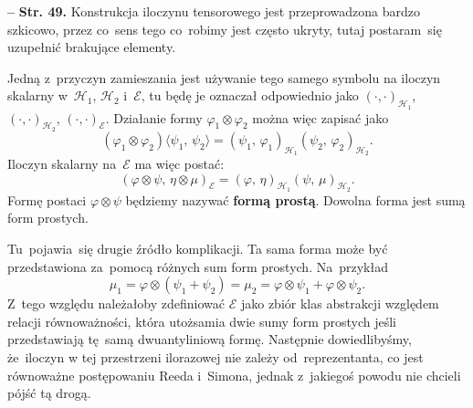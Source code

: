 \documentclass[a4paper,11pt]{article}
\newcommand{\spaceFour}{0.5em}
\newcommand{\tb}{\textbf}
\newcommand{\noi}{\noindent}
\newcommand{\tb}{\textbf}
\newcommand{\noi}{\noindent}
\newcommand{\start}{\noi \tb{--} {}}
\newcommand{\Str}[1]{\tb{Str. #1.}}
\newcommand{\mc}{\mathcal}
\newcommand{\al}{\alpha}
\newcommand{\vp}{\varphi}
\newcommand{\Hc}{\mc{H}}
\newcommand{\ot}{\otimes}
\newcommand{\lket}{\langle}
\newcommand{\rket}{\rangle}
\newcommand{\SP}[2]{( #1, \, #2 )}  %
\newcommand{\dket}[2]{\lket #1, \, #2 \rket}  %
\begin{document}
\vspace{\spaceFour}



\start \Str{49} Konstrukcja iloczynu tensorowego jest przeprowadzona
bardzo szkicowo, przez co~sens tego co~robimy jest często ukryty,
tutaj postaram~się uzupełnić brakujące elementy.


Jedną z~przyczyn zamieszania jest używanie tego samego symbolu na
iloczyn skalarny w~$\Hc_{ 1 }$, $\Hc_{ 2 }$ i~$\mc{E}$, tu będę je
oznaczał odpowiednio jako $( \cdot, \cdot )_{ \Hc_{ 1 } }$,
$( \cdot, \cdot )_{ \Hc_{ 2 } }$, $( \cdot, \cdot )_{ \mc{ E } }$.
Działanie formy $\vp_{ 1 } \ot \vp_{ 2 }$ można więc zapisać jako
\begin{equation*}
  ( \vp_{ 1 } \ot \vp_{ 2 } )\dket{ \psi_{ 1 }}{ \psi_{ 2 } }
  = \SP{ \psi_{ 1 } }{ \vp_{ 1 } }_{ \Hc_{ 1 } } \SP{ \psi_{ 2 } }
  { \vp_{ 2 } }_{ \Hc_{ 2 } }.
\end{equation*}
Iloczyn skalarny na~$\mc{E}$ ma więc postać:
\begin{equation*}
  \SP{ \vp \ot \psi }{ \eta \ot \mu }_{ \mc{E} }
  = \SP{ \vp }{ \eta }_{ \Hc_{ 1 } } \SP{ \psi }{ \mu }_{ \Hc_{ 2 } }.
\end{equation*}
Formę postaci $\vp \ot \psi$ będziemy nazywać \tb{formą prostą}.
Dowolna forma jest sumą form prostych.

Tu~pojawia~się drugie źródło komplikacji. Ta sama forma może być
przedstawiona za~pomocą różnych sum form prostych. Na~przykład
\begin{equation*}
  \mu_{ 1 } = \vp \ot ( \psi_{ 1 } + \psi_{ 2 } ) = \mu_{ 2 }
  = \vp \ot \psi_{ 1 } + \vp \ot \psi_{ 2 }.
\end{equation*}
Z~tego względu należałoby zdefiniować $\mc{E}$ jako zbiór klas
abstrakcji względem relacji równoważności, która utożsamia dwie sumy
form prostych jeśli przedstawiają tę~samą dwuantyliniową formę.
Następnie dowiedlibyśmy, że~iloczyn w tej przestrzeni ilorazowej nie
zależy od~reprezentanta, co jest równoważne postępowaniu Reeda
i~Simona, jednak z~jakiegoś powodu nie chcieli pójść tą drogą.
\end{document}
